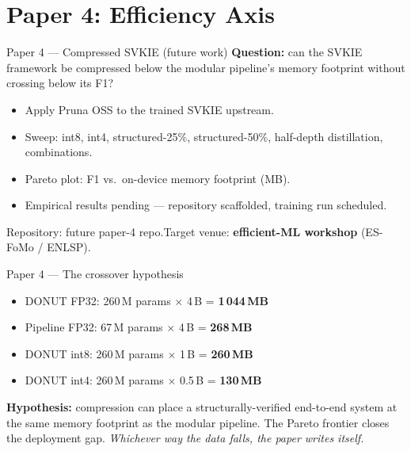 \documentclass{beamer}
\begin{document}
\section{Paper 4: Efficiency Axis}
\begin{frame}{Paper 4 --- Compressed SVKIE (future work)}
  \textbf{Question:} can the SVKIE framework be compressed below the
  modular pipeline's memory footprint without crossing below its F1?
  \vspace{0.5em}
  \begin{itemize}
    \item Apply Pruna OSS to the trained SVKIE upstream.
    \item Sweep: int8, int4, structured-25\%, structured-50\%,
          half-depth distillation, combinations.
    \item Pareto plot: F1 vs.\ on-device memory footprint (MB).
    \item Empirical results pending --- repository scaffolded,
          training run scheduled.
  \end{itemize}
  Repository: future paper-4 repo.\quad Target venue: \textbf{efficient-ML workshop}
  (ES-FoMo / ENLSP).
\end{frame}

\begin{frame}{Paper 4 --- The crossover hypothesis}
  \begin{itemize}
    \item DONUT FP32: 260\,M params $\times$ 4\,B = \textbf{1\,044\,MB}
    \item Pipeline FP32: 67\,M params $\times$ 4\,B = \textbf{268\,MB}
    \item DONUT int8: 260\,M params $\times$ 1\,B = \textbf{260\,MB}
    \item DONUT int4: 260\,M params $\times$ 0.5\,B = \textbf{130\,MB}
  \end{itemize}
  \vspace{0.5em}
  \textbf{Hypothesis:} compression can place a structurally-verified
  end-to-end system at the same memory footprint as the modular
  pipeline.  The Pareto frontier closes the deployment gap.
  \vspace{0.5em}
  \emph{Whichever way the data falls, the paper writes itself.}
\end{frame}

\end{document}
